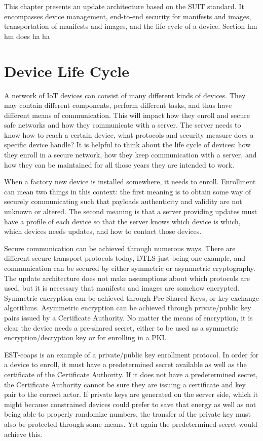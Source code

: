 \documentclass[0-thesis.tex]{subfiles}
\begin{document}
This chapter presents an update architecture based on the SUIT standard. It encompasses
device management, end-to-end security for manifests and images, transportation of
manifests and images, and the life cycle of a device. Section hm hm does ha ha

\section{Device Life Cycle}
\label{sec:device-lifecycle}
A network of IoT devices can consist of many different kinds of devices. They may contain
different components, perform different tasks, and thus have different means of
communication. This will impact how they enroll and secure safe networks and how they
communicate with a server. The server needs to know how to reach a certain device, what
protocols and security measure does a specific device handle? It is helpful to think about
the life cycle of devices: how they enroll in a secure network, how they keep communication
with a server, and how they can be maintained for all those years they are intended to
work.

When a factory new device is installed somewhere, it needs to enroll. Enrollment can mean
two things in this context: the first meaning is to obtain some way of securely
communicating such that payloads authenticity and validity are not unknown or altered. The
second meaning is that a server providing updates must have a profile of each device so
that the server knows which device is which, which devices needs updates, and how to
contact those devices. 

Secure communication can be achieved through numerous ways. There are different secure
transport protocols today, DTLS just being one example, and communication can be secured
by either symmetric or asymmetric cryptography. The update architecture does not make
assumptions about which protocols are used, but it is necessary that manifests and images
are somehow encrypted. Symmetric encryption can be achieved through Pre-Shared Keys, or
key exchange algorithms. Asymmetric encryption can be achieved through private/public key
pairs issued by a Certificate Authority. No matter the means of encryption, it is clear
the device needs a pre-shared secret, either to be used as a symmetric
encryption/decryption key or for enrolling in a PKI.

EST-coaps is an example of a private/public key enrollment protocol. In order for a device
to enroll, it must have a predetermined secret available as well as the certificate of the
Certificate Authority. If it does not have a predetermined secret, the Certificate
Authority cannot be sure they are issuing a certificate and key pair to the correct actor.
If private keys are generated on the server side, which it might because constrained
devices could prefer to save that energy as well as not being able to properly randomize
numbers, the transfer of the private key must also be protected through some means. Yet
again the predetermined secret would achieve this.
\end{document}
